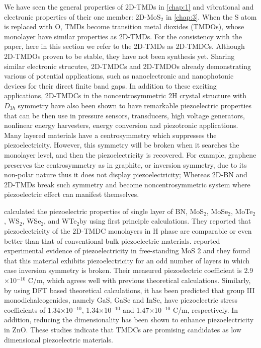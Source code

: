We have seen the general properties of 2D-TMDs in \autoref{chap:1} and vibrational and electronic properties of their one member: 2D-MoS$_2$ in \autoref{chap:3}. When the S atom is replaced with O, TMDs become transition metal dioxides (TMDOs), whose monolayer have similar properties as 2D-TMDs. For the consistency with the paper, here in this section we refer to the 2D-TMDs as 2D-TMDCs. Although 2D-TMDOs proven to be stable, they have not been synthesis yet. Sharing similar electronic strucutre, 2D-TMDCs and 2D-TMDOs already demonstrating various of potential applications, such as nanoelectronic and nanophotonic devices for their direct finite band gaps\cite{Jariwala2014,Wang2012}. In addition to these exciting applications, 2D-TMDCs in the noncentrosymmetric 2H crystal structure with $D_{3h}$ symmetry have also been shown to have remarkable piezoelectric properties that can be then use in pressure sensors,  transducers,  high voltage generators,  nonlinear energy harvesters, energy conversion and piezotronic applications. Many layered materials have a centrosymmetry which suppresses the piezoelectricity. However, this symmetry will be broken when it searches the monolayer level, and then the piezoelectricity is recovered. For example, graphene preserves the centrosymmetry as in graphite, or inversion symmetry, due to its non-polar nature thus it does not display piezoelectricity; Whereas 2D-BN and 2D-TMDs break such symmetry and become noncentrosymmetric system where piezoelectric effect can manifest themselves. 

\citet{Duerloo2012} calculated the piezoelectric properties of single layer of BN, MoS$_2$, MoSe$_2$, MoTe$_2$, WS$_2$, WSe$_2$, and WTe$_2$by using first principle calculations. They reported that piezoelectricity of the 2D-TMDC monolayers in H phase are comparable or even better than that of conventional bulk piezoelectric materials. \citet{Zhu2015} reported 
experimental evidence of piezoelectricity in free-standing MoS 2 and they found that this material exhibits piezoelectricity for an odd number of layers in which case inversion symmetry is broken. Their measured piezoelectric coefficient is 2.9$\times$10$^{-10}$ C/m, which agrees well with previous theoretical calculations\cite{Duerloo2012}.  Similarly, by using DFT based theoretical calculations, it has been predicted that group III monodichalcogenides, namely GaS, GaSe and InSe, have piezoelectric stress coefficients of 1.34$\times$10$^{-10}$, 1.34$\times$10$^{-10}$ and 1.47$\times$10$^{-10}$ C/m, respectively\cite{Li2015a}.  In addition, reducing the dimensionality has been shown to enhance piezoelectricity in ZnO\cite{Xiang2006}. These studies indicate that TMDCs are promising candidates as low dimensional piezoelectric materials. 


